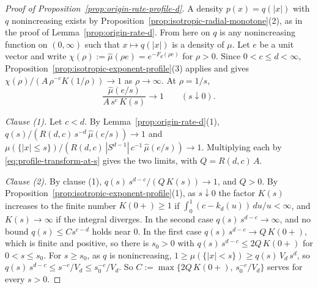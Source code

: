 \begin{proof}[Proof of Proposition~\ref{prop:origin-rate-profile-d}]
A density $p(x) = q(|x|)$ with $q$ nonincreasing exists by
Proposition~\ref{prop:isotropic-radial-monotone}(2), as in the proof of Lemma~\ref{prop:origin-rate-d}. From here on
$q$ is any nonincreasing function on $(0,\infty)$ such that $x \mapsto q(|x|)$ is a density of
$\mu$. Let $e$ be a unit vector and write $\chi(\rho) := \widehat\mu(\rho e) = e^{-F_d(\rho e)}$
for $\rho > 0$. Since $0 < c \le d < \infty$, Proposition~\ref{prop:isotropic-exponent-profile}(3) applies and
gives $\chi(\rho)/(A\,\rho^{-c}K(1/\rho)) \to 1$ as $\rho \to \infty$. At $\rho = 1/s$,
\begin{equation}\label{eq:profile-transform-at-s}
  \frac{\widehat\mu(e/s)}{A\,s^{c}\,K(s)} \to 1 \qquad (s \downarrow 0) .
\end{equation}

\emph{Clause (1).} Let $c < d$. By Lemma~\ref{prop:origin-rate-d}(1),
$q(s)/(R(d,c)\,s^{-d}\,\widehat\mu(e/s)) \to 1$ and
$\mu(\{|x| \le s\})/(R(d,c)\,|S^{d-1}|\,c^{-1}\,\widehat\mu(e/s)) \to 1$. Multiplying each by
\ref{eq:profile-transform-at-s} gives the two limits, with $Q = R(d,c)\,A$.

\emph{Clause (2).} By clause (1), $q(s)\,s^{d-c}/(Q\,K(s)) \to 1$, and $Q > 0$. By
Proposition~\ref{prop:isotropic-exponent-profile}(1), as $s \downarrow 0$ the factor $K(s)$ increases to the
finite number $K(0{+}) \ge 1$ if $\int_0^1(c - k_d(u))\,du/u < \infty$, and $K(s) \to \infty$ if
the integral diverges. In the second case $q(s)\,s^{d-c} \to \infty$, and no bound
$q(s) \le C s^{c-d}$ holds near $0$. In the first case $q(s)\,s^{d-c} \to Q\,K(0{+})$, which is
finite and positive, so there is $s_0 > 0$ with
$q(s)\,s^{d-c} \le 2Q\,K(0{+})$ for $0 < s \le s_0$. For $s \ge s_0$, as $q$ is nonincreasing,
$1 \ge \mu(\{|x| < s\}) \ge q(s)\,V_d\,s^{d}$, so
$q(s)\,s^{d-c} \le s^{-c}/V_d \le s_0^{-c}/V_d$. So
$C := \max\{2Q\,K(0{+}),\,s_0^{-c}/V_d\}$ serves for every $s > 0$.


\end{proof}

